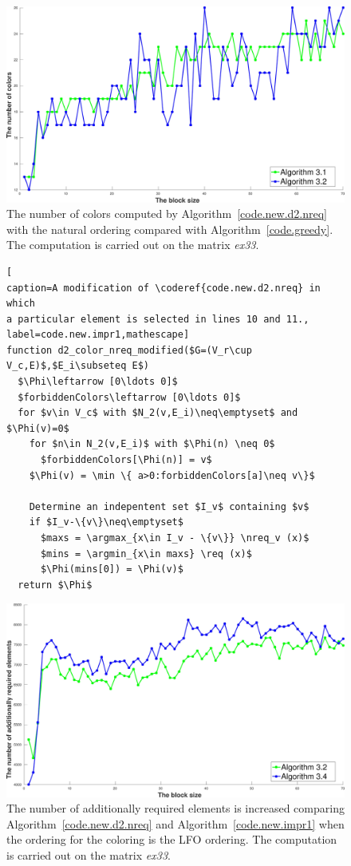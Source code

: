 \documentclass[12pt, twoside,a4paper,toc=bibliography]{scrbook}
\DeclareMathOperator*{\argmin}{arg\,min}
\DeclareMathOperator*{\argmax}{arg\,max}
\newcommand{\coderef}[1]{Algorithm~\protect\ref{#1}}
\newcommand{\nreq}{L}
\newcommand{\req}{M}
\begin{document}
\begin{figure}
\centering
\includegraphics[width=0.9\linewidth]{ex33_alg31_alg32_bls_nat_cols}
\caption{The number of colors computed by \coderef{code.new.d2.nreq} with the natural ordering
compared with \coderef{code.greedy}. 
The computation is carried out on the matrix \textit{ex33}. }
\label{ex33_alg31_alg32_bls_nat_cols}
\end{figure}

\begin{figure}
\begin{lstlisting}[
caption=A modification of \coderef{code.new.d2.nreq} in which
a particular element is selected in lines 10 and 11.,
label=code.new.impr1,mathescape]
function d2_color_nreq_modified($G=(V_r\cup V_c,E)$,$E_i\subseteq E$)
  $\Phi\leftarrow [0\ldots 0]$
  $forbiddenColors\leftarrow [0\ldots 0]$
  for $v\in V_c$ with $N_2(v,E_i)\neq\emptyset$ and $\Phi(v)=0$
    for $n\in N_2(v,E_i)$ with $\Phi(n) \neq 0$
      $forbiddenColors[\Phi(n)] = v$
    $\Phi(v) = \min \{ a>0:forbiddenColors[a]\neq v\}$

    Determine an indepentent set $I_v$ containing $v$
    if $I_v-\{v\}\neq\emptyset$
      $maxs = \argmax_{x\in I_v - \{v\}} \nreq_v (x)$
      $mins = \argmin_{x\in maxs} \req (x)$
      $\Phi(mins[0]) = \Phi(v)$
  return $\Phi$
\end{lstlisting}
\end{figure}

\begin{figure}
\centering
\includegraphics[width=0.9\linewidth]{ex33_alg32_alg34_bls_lfo_add}
\caption{The number of additionally
required elements is increased comparing \coderef{code.new.d2.nreq}
and \coderef{code.new.impr1} when the ordering for the coloring is the LFO ordering.
The computation is carried out on the matrix \textit{ex33}. }
\label{ex33_alg32_alg34_bls_lfo_add}
\end{figure}
\end{document}
